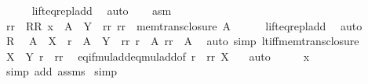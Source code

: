 \begin{isabellebody}
\ \ \ \ \isamarkupfalse%
\ lift{\isacharunderscore}{\kern0pt}eq{\isacharunderscore}{\kern0pt}repl{\isacharunderscore}{\kern0pt}add\ \isamarkupfalse%
\ auto\isanewline
\ \ \isamarkupfalse%
\ asm\ \isamarkupfalse%
\ rr\ \ RR{\isacharcolon}{\kern0pt}\ {\isachardoublequoteopen}x\ {\isacharequal}{\kern0pt}\ A\ {\isacharasterisk}{\kern0pt}\ Y\ {\isacharplus}{\kern0pt}\ rr{\isachardoublequoteclose}\ {\isachardoublequoteopen}rr\ {\isasymin}\ mem{\isacharunderscore}{\kern0pt}trans{\isacharunderscore}{\kern0pt}closure\ A{\isachardoublequoteclose}\isanewline
\ \ \ \ \isamarkupfalse%
\ lift{\isacharunderscore}{\kern0pt}eq{\isacharunderscore}{\kern0pt}repl{\isacharunderscore}{\kern0pt}add\ \isamarkupfalse%
\ auto\isanewline
\ \ \isamarkupfalse%
\ R\ \isamarkupfalse%
\ {\isachardoublequoteopen}A\ {\isacharasterisk}{\kern0pt}\ X\ {\isacharplus}{\kern0pt}\ r\ {\isacharequal}{\kern0pt}\ A\ {\isacharasterisk}{\kern0pt}\ Y\ {\isacharplus}{\kern0pt}\ rr{\isachardoublequoteclose}\ {\isachardoublequoteopen}r\ {\isacharless}{\kern0pt}\ A{\isachardoublequoteclose}\ {\isachardoublequoteopen}rr\ {\isacharless}{\kern0pt}\ A{\isachardoublequoteclose}\ \isamarkupfalse%
\ {\isacharparenleft}{\kern0pt}auto\ simp{\isacharcolon}{\kern0pt}\ lt{\isacharunderscore}{\kern0pt}iff{\isacharunderscore}{\kern0pt}mem{\isacharunderscore}{\kern0pt}trans{\isacharunderscore}{\kern0pt}closure{\isacharparenright}{\kern0pt}\isanewline
\ \ \isamarkupfalse%
\ \isamarkupfalse%
\ {\isachardoublequoteopen}X\ {\isacharequal}{\kern0pt}\ Y{\isachardoublequoteclose}\ {\isachardoublequoteopen}r\ {\isacharequal}{\kern0pt}\ rr{\isachardoublequoteclose}\ \isamarkupfalse%
\ eq{\isacharunderscore}{\kern0pt}if{\isacharunderscore}{\kern0pt}mul{\isacharunderscore}{\kern0pt}add{\isacharunderscore}{\kern0pt}eq{\isacharunderscore}{\kern0pt}mul{\isacharunderscore}{\kern0pt}add{\isacharbrackleft}{\kern0pt}of\ r\ {\isacharunderscore}{\kern0pt}\ rr\ X\ {\isacharunderscore}{\kern0pt}{\isacharbrackright}{\kern0pt}\ \isamarkupfalse%
\ auto\isanewline
\ \ \isamarkupfalse%
\ \isamarkupfalse%
\ {\isachardoublequoteopen}x\ {\isasymin}\ {}{\isachardoublequoteclose}\ \isamarkupfalse%
\ {\isacharparenleft}{\kern0pt}simp\ add{\isacharcolon}{\kern0pt}\ assms{\isacharparenright}{\kern0pt}\isanewline
{}\isamarkupfalse%
\ simp%
\endisatagproof
{\isafoldproof}%
%
\isadelimproof
\isanewline
%
\endisadelimproof
\isanewline
%
\isadelimtheory
\isanewline
%
\endisadelimtheory
%
\isatagtheory
{}\isamarkupfalse%
%
\endisatagtheory
{\isafoldtheory}%
%
\isadelimtheory
%
\endisadelimtheory
%
\end{isabellebody}%
